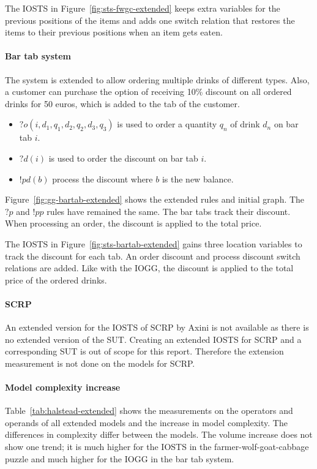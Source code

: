 The IOSTS in Figure~\ref{fig:sts-fwgc-extended} keeps extra variables for the previous positions of the items and adds one switch relation that restores the items to their previous positions when an item gets eaten.

\paragraph*{Bar tab system}
The system is extended to allow ordering multiple drinks of different types. Also, a customer can purchase the option of receiving 10\% discount on all ordered drinks for 50 euros, which is added to the tab of the customer.
\vspace{5px}
\begin{itemize}
\item $?o(i,d_1,q_1,d_2,q_2,d_3,q_3)$ is used to order a quantity $q_n$ of drink $d_n$ on bar tab $i$. 
\item $?d(i)$ is used to order the discount on bar tab $i$.
\item $!pd(b)$ process the discount where $b$ is the new balance. 
\end{itemize}
\vspace{5px}
Figure~\ref{fig:gg-bartab-extended} shows the extended rules and initial graph. The $?p$ and $!pp$ rules have remained the same. The bar tabs track their discount. When processing an order, the discount is applied to the total price.

The IOSTS in Figure~\ref{fig:sts-bartab-extended} gains three location variables to track the discount for each tab. An order discount and process discount switch relations are added. Like with the IOGG, the discount is applied to the total price of the ordered drinks.

\paragraph*{SCRP}
An extended version for the IOSTS of SCRP by Axini is not available as there is no extended version of the SUT. Creating an extended IOSTS for SCRP and a corresponding SUT is out of scope for this report. Therefore the extension measurement is not done on the models for SCRP.

\paragraph*{Model complexity increase}
Table~\ref{tab:halstead-extended} shows the measurements on the operators and operands of all extended models and the increase in model complexity. The differences in complexity differ between the models. The volume increase does not show one trend; it is much higher for the IOSTS in the farmer-wolf-goat-cabbage puzzle and much higher for the IOGG in the bar tab system.

